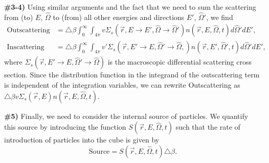 \documentclass[12pt]{article}
\newcommand{\rvec}{\ensuremath{\vec{r}}}
\newcommand{\omvec}{\ensuremath{\hat{\Omega}}}
\begin{document}
\textbf{\#3-4)} Using similar arguments and the fact that we need to sum the scattering from (to) $E$,
$\omvec$ to (from) all other energies and directions $E'$, $\omvec'$, we find
\begin{align*}
\textrm{Outscattering} &= \triangle \beta \int_0^{\infty}\int_{4\pi}
v\Sigma_s(\rvec,E\rightarrow E', \omvec\rightarrow\omvec')n(\rvec,E,\omvec,t)d\omvec'dE', \\
\textrm{Inscattering} &= \triangle \beta \int_0^{\infty}\int_{4\pi}
v'\Sigma_s(\rvec,E'\rightarrow E, \omvec'\rightarrow\omvec,)n(\rvec,E',\omvec',t)d\omvec'dE',
\end{align*}
 where $\Sigma_s(\rvec,E'\rightarrow E, \omvec'\rightarrow\omvec)$ is the macroscopic differential scattering cross section. Since the distribution function in the integrand of the outscattering term is independent of
 the integration variables, we can rewrite
Outscattering as $\triangle \beta v\Sigma_s(\rvec,E)n(\rvec, E, \omvec,t).$

\textbf{\#5)} Finally, we need to consider the internal source of particles. We
quantify this source  by introducing the function $S(\rvec, E, \omvec, t)$
such that the rate of introduction of particles into the cube is given by
\begin{equation*}
\textrm{Source} = S(\rvec,E,\omvec,t)\triangle \beta.
\end{equation*}
\end{document}
